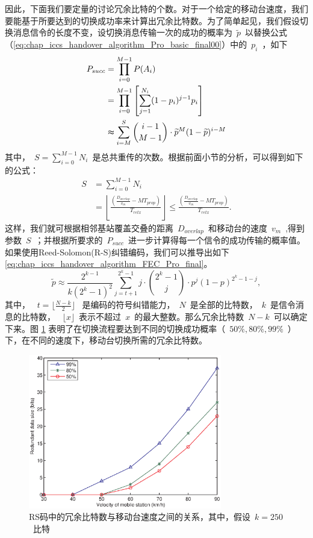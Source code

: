 因此，下面我们要定量的讨论冗余比特的个数。对于一个给定的移动台速度，我们要能基于所要达到的切换成功率来计算出冗余比特数。为了简单起见，我们假设切换消息信令的长度不变，设切换消息传输一次的成功的概率为~$\tilde{p}$~以替换公式（\ref{eq:chap_iccs_handover_algorithm_Pro_basic_final00}）中的~$p_i$~，如下
\begin{align}
\notag P_{succ} &= \prod_{i=0}^{M-1}P(A_{i})\\
&= \prod_{i=0}^{M-1}\left[\sum_{j=1}^{N_{i}}(1-p_{i})^{j-1}p_{i}\right]\\
\notag &\thickapprox\sum_{i=M}^{S}{i-1 \choose M-1}\cdot\widetilde{p}^{M}(1-\widetilde{p})^{i-M}
\end{align}
其中，~$S=\sum_{i=0}^{M-1}N_{i}$~是总共重传的次数。根据前面小节的分析，可以得到如下的公式：
\begin{align*}
S & = \sum_{i=0}^{M-1}N_{i}\\
  & = \left\lfloor \frac{(\frac{D_{overlap}}{v_{m}}-MT_{prop})}
        {T_{retx}}\right\rfloor \leq\frac{(\frac{D_{overlap}}{v_{m}}
        -MT_{prop})}{T_{retx}}.
\end{align*}
这样，我们就可根据相邻基站覆盖交叠的距离~$D_{overlap}$~和移动台的速度~$v_m$~,得到参数~$S$~；并根据所要求的~$P_{succ}$~进一步计算得每一个信令的成功传输的概率值。如果使用Reed-Solomon(R-S)纠错编码，我们可以推导出如下\eqref{eq:chap_iccs_handover_algorithm_FEC_Pro_final}。
\begin{equation}\label{eq:chap_iccs_handover_algorithm_FEC_Pro_final}
\tilde{p}\approx\frac{2^{k-1}}{k(2^{k}-1)^{2}}\sum_{j=t+1}^{2^{k}-1}j
\cdot{2^{k}-1\choose j}_{}^{}\cdot p^{j}(1-p)^{2^{k}-1-j},
\end{equation}
其中， ~$t=\lfloor\frac{N-k}{2}\rfloor$~ 是编码的符号纠错能力，~$N$~是全部的比特数，~$k$~是信令消息的比特数， ~$\lfloor{x}\rfloor$~表示不超过~$x$~的最大整数。那么冗余比特数~$N-k$~可以确定下来。图 \ref{fig:chap_iccs_handover_algorithm_AFEC_bits} 表明了在切换流程要达到不同的切换成功概率（~$50\%,80\%,99\%$~）下，在不同的速度下，移动台切换所需的冗余比特数。
\begin{figure}[t]
\begin{centering}
\includegraphics[height=6.75cm]{iccs_speed_size_theory}
\caption{RS码中的冗余比特数与移动台速度之间的关系，其中，假设~$k=250$~比特}
\label{fig:chap_iccs_handover_algorithm_AFEC_bits}
\end{centering}
\end{figure}
